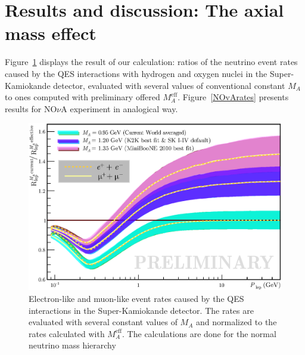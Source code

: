 \section{Results and discussion: The axial mass effect}
Figure~\ref{SKrates} displays the result of our calculation: ratios of the neutrino event rates caused by the QES interactions with hydrogen and oxygen nuclei in the Super-Kamiokande detector, evaluated with several values of conventional constant $M_{A}$ to ones computed with preliminary offered $M_{A}^{\mathrm{eff}}$. Figure~\ref{NOvArates} presents results for NO$\nu$A experiment in analogical way.

\begin{figure}[htb!]
\includegraphics[width=\columnwidth]{./SK/cvsv2lmn_all2.eps}
\caption{\label{SKrates}Electron-like and muon-like event rates caused by the QES interactions in the Super-Kamiokande detector. The rates are evaluated with several constant values of $M_{A}$ and normalized to the rates calculated with $M_{A}^{\mathrm{eff}}$. The calculations are done for the normal neutrino mass hierarchy}
\end{figure}

